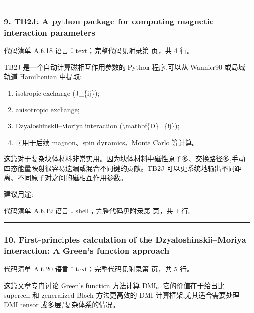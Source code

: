\documentclass[lang=cn,scheme=chinese,color=blue,device=normal,toc=onecol,math=cm]{elegantbook}
\begin{document}
\medskip\hrule\medskip


\subsubsection{9. TB2J: A python package for computing magnetic interaction parameters}


\begin{codeindexbox}{代码清单 A.6.18}
语言：text；完整代码见附录第 \pageref{code:6:18} 页，共 4 行。
\end{codeindexbox}


TB2J 是一个自动计算磁相互作用参数的 Python 程序,可以从 Wannier90 或局域轨道 Hamiltonian 中提取:\par


\begin{enumerate}
\item isotropic exchange (J\_\allowbreak{}\{ij\});
\item anisotropic exchange;
\item Dzyaloshinskii–Moriya interaction (\textbackslash{}\allowbreak{}mathbf\{D\}\_\allowbreak{}\{ij\});
\item 可用于后续 magnon、spin dynamics、Monte Carlo 等计算。
\end{enumerate}


这篇对于复杂块体材料非常实用。因为块体材料中磁性原子多、交换路径多,手动四态能量映射很容易遗漏或混合不同键的贡献。TB2J 可以更系统地输出不同距离、不同原子对之间的磁相互作用参数。\par


建议用途:\par


\begin{codeindexbox}{代码清单 A.6.19}
语言：shell；完整代码见附录第 \pageref{code:6:19} 页，共 1 行。
\end{codeindexbox}


\medskip\hrule\medskip


\subsubsection{10. First-principles calculation of the Dzyaloshinskii–Moriya interaction: A Green’s function approach}


\begin{codeindexbox}{代码清单 A.6.20}
语言：text；完整代码见附录第 \pageref{code:6:20} 页，共 5 行。
\end{codeindexbox}


这篇文章专门讨论 Green’s function 方法计算 DMI。它的价值在于给出比 supercell 和 generalized Bloch 方法更高效的 DMI 计算框架,尤其适合需要处理 DMI tensor 或多层/\allowbreak{}复杂体系的情况。\par
\end{document}
